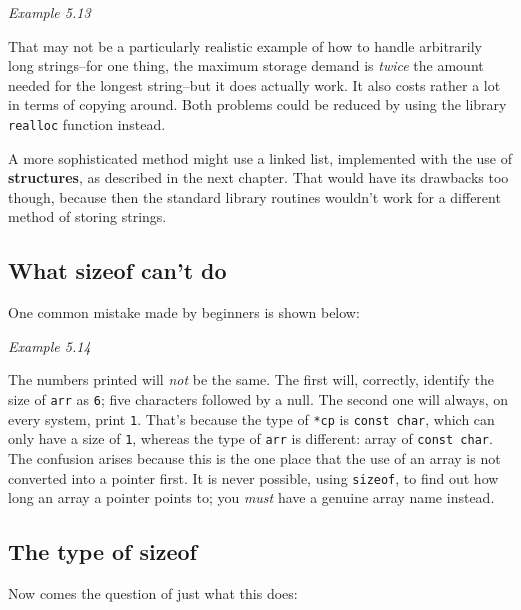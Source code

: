   \begin{center}\textit{Example 5.13}\end{center}


  That may not be a particularly realistic example of how to handle
   arbitrarily long strings--for one thing, the maximum storage demand
   is \textit{twice} the amount needed for the longest string--but it
   does actually work. It also costs rather a lot in terms of copying
   around. Both problems could be reduced by using the library
   \texttt{realloc} function instead.


  A more sophisticated method might use a linked list, implemented with
   the use of \textbf{structures}, as described in the next chapter. That
   would have its drawbacks too though, because then the standard library
   routines wouldn't work for a different method of storing strings.


  \subsection{What sizeof can't do}
   

   One common mistake made by beginners is shown below:


   \begin{center}\textit{Example 5.14}\end{center}


   The numbers printed will \textit{not} be the same. The first will,
    correctly, identify the size of \texttt{arr} as \texttt{6}; five
    characters followed by a null. The second one will always, on every
    system, print \texttt{1}. That's because the type of
    \texttt{*cp} is \texttt{const char}, which can only have a size
    of \texttt{1}, whereas the type of \texttt{arr} is different:
    array of \texttt{const char}. The confusion arises because this is
    the one place that the use of an array is not converted into a pointer
    first. It is never possible, using \texttt{sizeof}, to find out how
    long an array a pointer points to; you \textit{must} have a genuine
    array name instead.


  

  \subsection{The type of sizeof}
   

   Now comes the question of just what this does:


